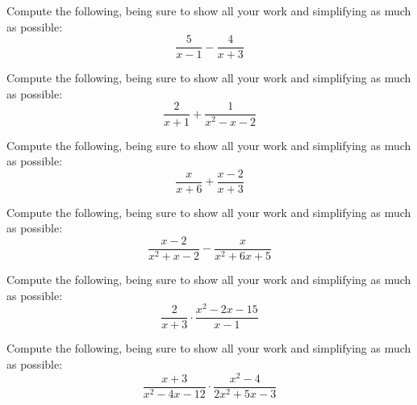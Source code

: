 \documentclass[11pt,letterpaper]{article}
\begin{document}

 Compute the following, being sure to show all your work and simplifying as much as possible:
	\[
	\dfrac{5}{x - 1} - \dfrac{4}{x + 3}
	\] \pspace





\newpage





 Compute the following, being sure to show all your work and simplifying as much as possible:
	\[
	\dfrac{2}{x + 1} + \dfrac{1}{x^2 - x - 2}
	\] \pspace





\newpage





 Compute the following, being sure to show all your work and simplifying as much as possible:
	\[
	\dfrac{x}{x + 6} + \dfrac{x - 2}{x + 3}
	\] \pspace





\newpage





 Compute the following, being sure to show all your work and simplifying as much as possible:
	\[
	\dfrac{x - 2}{x^2 + x - 2} - \dfrac{x}{x^2 + 6x + 5}
	\] \pspace





\newpage





 Compute the following, being sure to show all your work and simplifying as much as possible:
	\[
	\dfrac{2}{x + 3} \cdot \dfrac{x^2 - 2x - 15}{x - 1}
	\] \pspace





\newpage





 Compute the following, being sure to show all your work and simplifying as much as possible:
	\[
	\dfrac{x + 3}{x^2 - 4x - 12} \cdot \dfrac{x^2 - 4}{2x^2 + 5x - 3}
	\] \pspace
\end{document}
